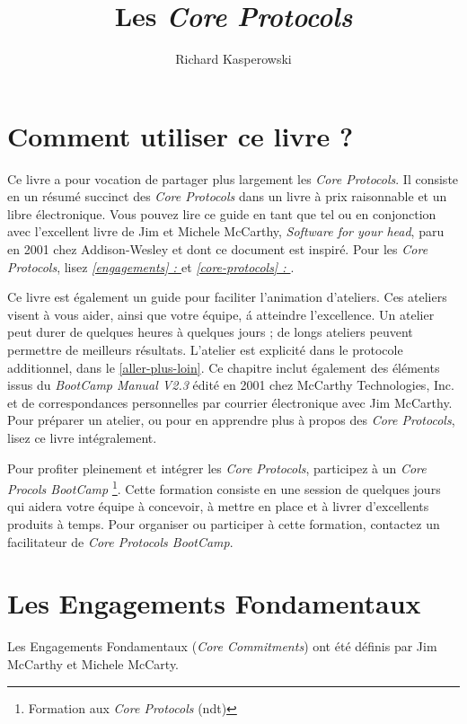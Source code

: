\documentclass{book}
\author{Richard Kasperowski}
\title{Les \textit{Core Protocols}}
\newcommand*{\numref}[1]{{\hyperref[{#1}]{\autoref*{#1}}}}
\newcommand*{\fullref}[1]{\textit{\hyperref[{#1}]{\autoref*{#1} : \nameref*{#1}}}}
\begin{document}
\tableofcontents

\chapter{Comment utiliser ce livre ?} \label{utiliser-ce-livre}

Ce livre a pour vocation de partager plus largement les \emph{Core Protocols}. Il consiste en un résumé succinct des 
\emph{Core Protocols} dans un livre à prix raisonnable et un libre électronique. Vous pouvez lire ce guide en tant que 
tel ou en conjonction avec l'excellent livre de Jim et Michele McCarthy, \emph{Software for your head}, paru en 2001
chez Addison-Wesley et dont ce document est inspiré. Pour les \emph{Core Protocols}, lisez \fullref{engagements} et 
\fullref{core-protocols}. 

Ce livre est également un guide pour faciliter l'animation d'ateliers. Ces ateliers visent à vous aider, ainsi que 
votre équipe, á atteindre l'excellence. Un atelier peut durer de quelques heures à quelques jours ; de longs ateliers
peuvent permettre de meilleurs résultats. L'atelier est explicité dans le protocole additionnel, 
dans le \numref{aller-plus-loin}. Ce chapitre inclut également des éléments issus du \emph{BootCamp Manual V2.3} édité en 
2001 chez McCarthy Technologies, Inc. et de correspondances personnelles par courrier électronique avec Jim McCarthy. Pour 
préparer un atelier, ou pour en apprendre plus à propos des \emph{Core Protocols}, lisez ce livre intégralement. 

Pour profiter pleinement et intégrer les \emph{Core Protocols}, participez à un \emph{Core Procols BootCamp}
\footnote{Formation aux \emph{Core Protocols} (ndt)}. Cette formation consiste en une session de quelques jours qui aidera
votre équipe à concevoir, à mettre en place et à livrer d'excellents produits à temps. Pour organiser ou participer à cette
formation, contactez un facilitateur de \emph{Core Protocols BootCamp}.

\chapter{Les Engagements Fondamentaux} \label{engagements}

Les Engagements Fondamentaux (\emph{Core Commitments}) ont été définis par Jim McCarthy 
et Michele McCarty. 
\end{document}
